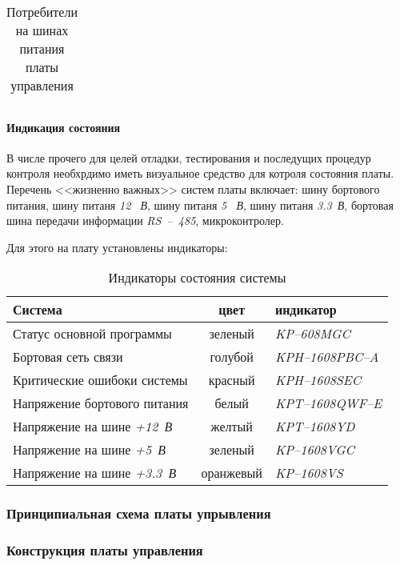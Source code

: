 \begin{table}[ht!]
\begin{tabu}{|X[l,m]|X[-1,c,m]|X[-1,c,m]|X[-1,c,m]|}
        \hline
    \end{tabu}
    \caption{Потребители на шинах питания платы управления}
    \label{powerConsumersOnBoard}
\end{table}

\paragraph{Индикация состояния}
В числе прочего для целей отладки, тестирования и последущих процедур контроля
необхрдимо иметь визуальное средство для котроля состояния платы.
Перечень <<жизненно важных>> систем платы включает:
шину бортового питания,
шину питаня \textit{12 ~В},
шину питаня \textit{5  ~В},
шину питаня \textit{3.3~В},
бортовая шина передачи информации \textit{RS~--~485},
микроконтролер.

Для этого на плату установлены индикаторы:
\begin{table}[ht!]
    \centering
    \begin{tabular}{|l|c|l|}
        \hline
        Система & цвет & индикатор \\
        \hline
        Статус основной программы & зеленый & \textit{KP--608MGC} \\
        Бортовая сеть связи & голубой & \textit{KPH--1608PBC--A} \\
        Критические ошибоки системы & красный & \textit{KPH--1608SEC} \\
        Напряжение бортового питания & белый & \textit{KPT--1608QWF--E} \\
        Напряжение на шине \textit{+12~В} & желтый & \textit{KPT--1608YD} \\
        Напряжение на шине \textit{+5~В} & зеленый & \textit{KP--1608VGC} \\
        Напряжение на шине \textit{+3.3~В} & оранжевый & \textit{KP--1608VS} \\
        \hline
    \end{tabular}
    \caption{Индикаторы состояния системы}
    \label{boardIndication}
\end{table}

\subsubsection{Принципиальная схема платы упрывления}

\subsubsection{Конструкция платы управления}
